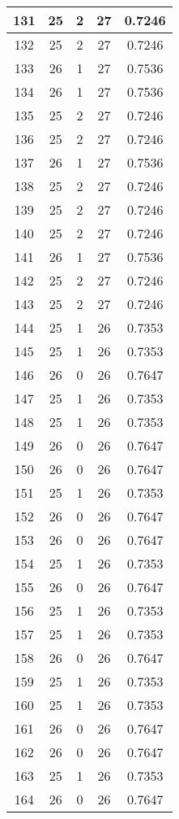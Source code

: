 \documentclass[letterpaper, 12pt]{article}
\begin{document}
\begin{longtable}{|c|c|c|c|c|}
\hline
131 & 25 & 2 & 27 & 0.7246 \\
\hline
132 & 25 & 2 & 27 & 0.7246 \\
\hline
133 & 26 & 1 & 27 & 0.7536 \\
\hline
134 & 26 & 1 & 27 & 0.7536 \\
\hline
135 & 25 & 2 & 27 & 0.7246 \\
\hline
136 & 25 & 2 & 27 & 0.7246 \\
\hline
137 & 26 & 1 & 27 & 0.7536 \\
\hline
138 & 25 & 2 & 27 & 0.7246 \\
\hline
139 & 25 & 2 & 27 & 0.7246 \\
\hline
140 & 25 & 2 & 27 & 0.7246 \\
\hline
141 & 26 & 1 & 27 & 0.7536 \\
\hline
142 & 25 & 2 & 27 & 0.7246 \\
\hline
143 & 25 & 2 & 27 & 0.7246 \\
\hline
144 & 25 & 1 & 26 & 0.7353 \\
\hline
145 & 25 & 1 & 26 & 0.7353 \\
\hline
146 & 26 & 0 & 26 & 0.7647 \\
\hline
147 & 25 & 1 & 26 & 0.7353 \\
\hline
148 & 25 & 1 & 26 & 0.7353 \\
\hline
149 & 26 & 0 & 26 & 0.7647 \\
\hline
150 & 26 & 0 & 26 & 0.7647 \\
\hline
151 & 25 & 1 & 26 & 0.7353 \\
\hline
152 & 26 & 0 & 26 & 0.7647 \\
\hline
153 & 26 & 0 & 26 & 0.7647 \\
\hline
154 & 25 & 1 & 26 & 0.7353 \\
\hline
155 & 26 & 0 & 26 & 0.7647 \\
\hline
156 & 25 & 1 & 26 & 0.7353 \\
\hline
157 & 25 & 1 & 26 & 0.7353 \\
\hline
158 & 26 & 0 & 26 & 0.7647 \\
\hline
159 & 25 & 1 & 26 & 0.7353 \\
\hline
160 & 25 & 1 & 26 & 0.7353 \\
\hline
161 & 26 & 0 & 26 & 0.7647 \\
\hline
162 & 26 & 0 & 26 & 0.7647 \\
\hline
163 & 25 & 1 & 26 & 0.7353 \\
\hline
164 & 26 & 0 & 26 & 0.7647 \\

\end{longtable}
\end{document}
